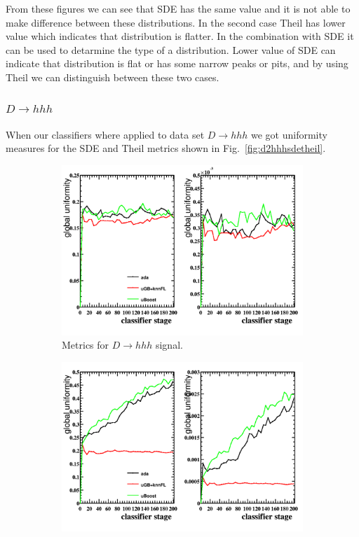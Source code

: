 From these figures we can see that SDE has the same value and it is not able to make difference between these distributions. In the second case Theil has lower value which indicates that distribution is flatter. In the combination with SDE it can be used to detarmine the type of a distribution. Lower value of SDE can indicate that distribution is flat or has some narrow peaks or pits, and by using Theil we can distinguish between these two cases.

\subsubsection{$D \to hhh$}
When our classifiers where applied to data set $D \to hhh$ we got uniformity measures for the SDE and Theil
metrics shown in Fig.~\ref{fig:d2hhhsdetheil}.
\begin{figure}[h]
\centering
		\begin{subfigure}[b]{0.95\textwidth}
			\includegraphics[width=\textwidth]{graphs/D23hSignalEffs.png}
			\caption{Metrics for $D \to hhh$ signal.}
		\end{subfigure}
		\begin{subfigure}[b]{0.95\textwidth}
			\includegraphics[width=\textwidth]{graphs/D23hBgEffs.png}

\end{subfigure}
\end{figure}
